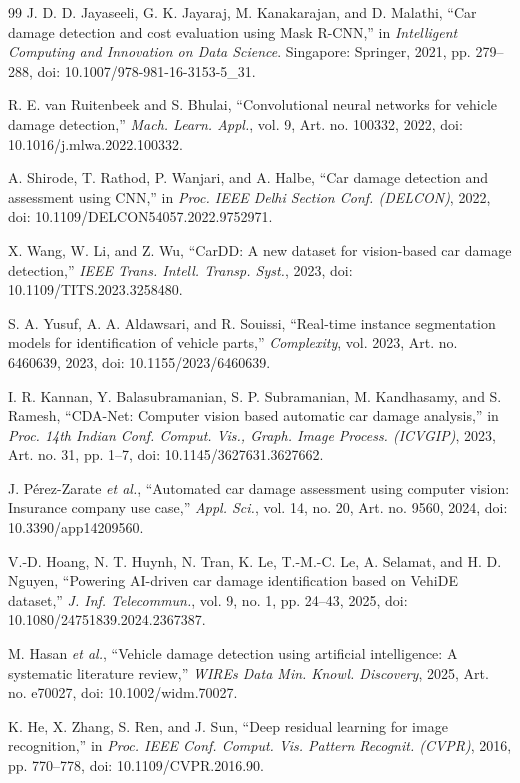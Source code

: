 \documentclass[conference]{IEEEtran}
\begin{document}
\begin{thebibliography}{99}
J. D. D. Jayaseeli, G. K. Jayaraj, M. Kanakarajan, and D. Malathi, ``Car damage detection and cost evaluation using Mask R-CNN,'' in \emph{Intelligent Computing and Innovation on Data Science}. Singapore: Springer, 2021, pp. 279--288, doi: 10.1007/978-981-16-3153-5\_31.

R. E. van Ruitenbeek and S. Bhulai, ``Convolutional neural networks for vehicle damage detection,'' \emph{Mach. Learn. Appl.}, vol. 9, Art. no. 100332, 2022, doi: 10.1016/j.mlwa.2022.100332.

A. Shirode, T. Rathod, P. Wanjari, and A. Halbe, ``Car damage detection and assessment using CNN,'' in \emph{Proc. IEEE Delhi Section Conf. (DELCON)}, 2022, doi: 10.1109/DELCON54057.2022.9752971.

X. Wang, W. Li, and Z. Wu, ``CarDD: A new dataset for vision-based car damage detection,'' \emph{IEEE Trans. Intell. Transp. Syst.}, 2023, doi: 10.1109/TITS.2023.3258480.

S. A. Yusuf, A. A. Aldawsari, and R. Souissi, ``Real-time instance segmentation models for identification of vehicle parts,'' \emph{Complexity}, vol. 2023, Art. no. 6460639, 2023, doi: 10.1155/2023/6460639.

I. R. Kannan, Y. Balasubramanian, S. P. Subramanian, M. Kandhasamy, and S. Ramesh, ``CDA-Net: Computer vision based automatic car damage analysis,'' in \emph{Proc. 14th Indian Conf. Comput. Vis., Graph. Image Process. (ICVGIP)}, 2023, Art. no. 31, pp. 1--7, doi: 10.1145/3627631.3627662.

J. P\'erez-Zarate \emph{et al.}, ``Automated car damage assessment using computer vision: Insurance company use case,'' \emph{Appl. Sci.}, vol. 14, no. 20, Art. no. 9560, 2024, doi: 10.3390/app14209560.

V.-D. Hoang, N. T. Huynh, N. Tran, K. Le, T.-M.-C. Le, A. Selamat, and H. D. Nguyen, ``Powering AI-driven car damage identification based on VehiDE dataset,'' \emph{J. Inf. Telecommun.}, vol. 9, no. 1, pp. 24--43, 2025, doi: 10.1080/24751839.2024.2367387.

M. Hasan \emph{et al.}, ``Vehicle damage detection using artificial intelligence: A systematic literature review,'' \emph{WIREs Data Min. Knowl. Discovery}, 2025, Art. no. e70027, doi: 10.1002/widm.70027.

K. He, X. Zhang, S. Ren, and J. Sun, ``Deep residual learning for image recognition,'' in \emph{Proc. IEEE Conf. Comput. Vis. Pattern Recognit. (CVPR)}, 2016, pp. 770--778, doi: 10.1109/CVPR.2016.90.


\end{thebibliography}
\end{document}
